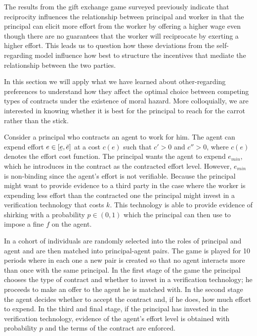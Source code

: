 \documentclass[12pt]{article}
\newcommand{\ubar}[1]{\underaccent{\bar}{#1}}
\begin{document}
The results from the gift exchange game surveyed previously indicate that reciprocity influences the relationship between principal and worker in that the principal can elicit more effort from the worker by offering a higher wage even though there are no guarantees that the worker will reciprocate by exerting a higher effort. This leads us to question how these deviations from the self-regarding model influence how best to structure the incentives that mediate the relationship between the two parties. 

In this section we will apply what we have learned about other-regarding preferences to understand how they affect the optimal choice between competing types of contracts under the existence of moral hazard. More colloquially, we are interested in knowing whether it is best for the principal to reach for the carrot rather than the stick.

Consider a principal who contracts an agent to work for him. The agent can expend effort $e \in \left[\ubar{e},\bar{e}\right]$ at a cost $c\left(e\right)$ such that ${c}'>0$ and ${c}''>0$, where $c(e)$ denotes the effort cost function. The principal wants the agent to expend $e_{min}$, which he introduces in the contract as the contracted effort level. However, $e_{min}$ is non-binding since the agent's effort is not verifiable. Because the principal might want to provide evidence to a third party in the case where the worker is expending less effort than the contracted one the principal might invest in a verification technology that costs $k$. This technology is able to provide evidence of shirking with a probability $p\in \left(0,1\right)$ which the principal can then use to impose a fine $f$ on the agent.

In \cite{fehr2007fairness} a cohort of individuals are randomly selected into the roles of principal and agent and are then matched into principal-agent pairs. The game is played for 10 periods where in each one a new pair is created so that no agent interacts more than once with the same principal. In the first stage of the game the principal chooses the type of contract and whether to invest in a verification technology; he proceeds to make an offer to the agent he is matched with. In the second stage the agent decides whether to accept the contract and, if he does, how much effort to expend. In the third and final stage, if the principal has invested in the verification technology, evidence of the agent's effort level is obtained with probability $p$ and the terms of the contract are enforced.
\end{document}
